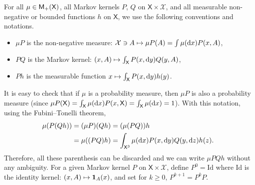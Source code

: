 \documentclass[english,graybox,envcountchap,envcountsame,sectrefs,shortlabels]{svmono}
\theoremstyle{style}
\newcommand{\Xset}{\mathsf{X}}
\newcommand{\Xsigma}{\mathcal{X}}
\begin{document}
For all $\mu\in\meas +(\Xset)$, all Markov kernels $P$, $Q$ on
$\Xset\times\Xsigma$, and all measurable non-negative or bounded
functions $h$ on $\Xset$, we use the following conventions and
notations.
\begin{itemize}[-]
\item $\mu P$ is the non-negative measure: $\Xsigma\ni A\mapsto\mu P(A)=\int\mu(\rmd x)P(x,A)$,
\item $PQ$ is the Markov kernel: $(x,A)\mapsto\int_{\Xset}P(x,\rmd y)Q(y,A)$,
\item $Ph$ is the measurable function $x\mapsto\int_{\Xset}P(x,\rmd y)h(y)$.
\end{itemize}
It is easy to check that if $\mu$ is a probability measure, then
$\mu P$ is also a probability measure (since $\mu P(\Xset)=\int_{\Xset}\mu(\rmd x)P(x,\Xset)=\int_{\Xset}\mu(\rmd x)=1$).
With this notation, using the Fubini--Tonelli theorem,
\begin{align*}
\mu(P(Qh)) & =(\mu P)(Qh)=(\mu(PQ))h\\
 & =\mu((PQ)h)=\int_{\Xset^{3}}\mu(\rmd x)P(x,\rmd y)Q(y,\rmd z)h(z).
\end{align*}
Therefore, all these parenthesis can be discarded and we can write $\mu PQh$ without any ambiguity. 
For a given
Markov kernel $P$ on $\Xset\times\Xsigma$, define $P^{0}=\mathrm{Id}$ where
$\mathrm{Id}$ is the identity kernel: $(x,A)\mapsto\mathbf{1}_{A}(x)$, and set for
$k\geq0$, $P^{k+1}=P^{k}P$.
\end{document}
